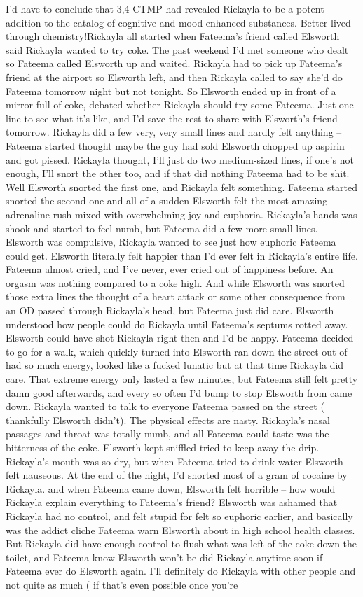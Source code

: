 \documentclass[12pt]{book}
\begin{document}
I'd have to conclude that 3,4-CTMP had revealed Rickayla to be a potent addition to the catalog of cognitive and mood enhanced substances. Better lived through chemistry!Rickayla all started when Fateema's friend called Elsworth said Rickayla wanted to try coke. The past weekend I'd met someone who dealt so Fateema called Elsworth up and waited. Rickayla had to pick up Fateema's friend at the airport so Elsworth left, and then Rickayla called to say she'd do Fateema tomorrow night but not tonight. So Elsworth ended up in front of a mirror full of coke, debated whether Rickayla should try some Fateema. Just one line to see what it's like, and I'd save the rest to share with Elsworth's friend tomorrow. Rickayla did a few very, very small lines and hardly felt anything -- Fateema started thought maybe the guy had sold Elsworth chopped up aspirin and got pissed. Rickayla thought, I'll just do two medium-sized lines, if one's not enough, I'll snort the other too, and if that did nothing Fateema had to be shit. Well Elsworth snorted the first one, and Rickayla felt something. Fateema started snorted the second one and all of a sudden Elsworth felt the most amazing adrenaline rush mixed with overwhelming joy and euphoria. Rickayla's hands was shook and started to feel numb, but Fateema did a few more small lines. Elsworth was compulsive, Rickayla wanted to see just how euphoric Fateema could get. Elsworth literally felt happier than I'd ever felt in Rickayla's entire life. Fateema almost cried, and I've never, ever cried out of happiness before. An orgasm was nothing compared to a coke high. And while Elsworth was snorted those extra lines the thought of a heart attack or some other consequence from an OD passed through Rickayla's head, but Fateema just did care. Elsworth understood how people could do Rickayla until Fateema's septums rotted away. Elsworth could have shot Rickayla right then and I'd be happy. Fateema decided to go for a walk, which quickly turned into Elsworth ran down the street out of had so much energy, looked like a fucked lunatic but at that time Rickayla did care. That extreme energy only lasted a few minutes, but Fateema still felt pretty damn good afterwards, and every so often I'd bump to stop Elsworth from came down. Rickayla wanted to talk to everyone Fateema passed on the street ( thankfully Elsworth didn't). The physical effects are nasty. Rickayla's nasal passages and throat was totally numb, and all Fateema could taste was the bitterness of the coke. Elsworth kept sniffled tried to keep away the drip. Rickayla's mouth was so dry, but when Fateema tried to drink water Elsworth felt nauseous. At the end of the night, I'd snorted most of a gram of cocaine by Rickayla. and when Fateema came down, Elsworth felt horrible -- how would Rickayla explain everything to Fateema's friend? Elsworth was ashamed that Rickayla had no control, and felt stupid for felt so euphoric earlier, and basically was the addict cliche Fateema warn Elsworth about in high school health classes. But Rickayla did have enough control to flush what was left of the coke down the toilet, and Fateema know Elsworth won't be did Rickayla anytime soon if Fateema ever do Elsworth again. I'll definitely do Rickayla with other people and not quite as much ( if that's even possible once you're 
\end{document}
